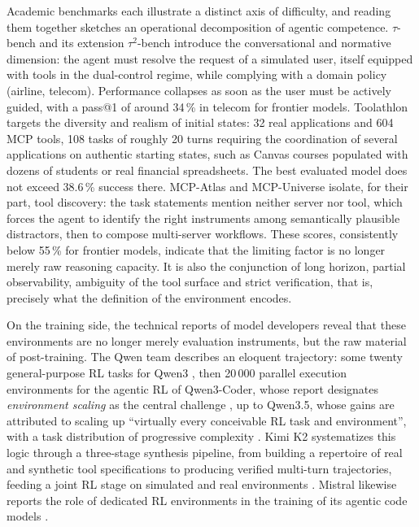 \documentclass[11pt,a4paper]{article}
\begin{document}
Academic benchmarks each illustrate a distinct axis of difficulty, and reading them together sketches an operational decomposition of agentic competence. $\tau$-bench and its extension $\tau^2$-bench \cite{taubench2024, tau2bench2025} introduce the conversational and normative dimension: the agent must resolve the request of a simulated user, itself equipped with tools in the dual-control regime, while complying with a domain policy (airline, telecom). Performance collapses as soon as the user must be actively guided, with a pass@1 of around 34\,\% in telecom for frontier models. Toolathlon \cite{toolathlon2025} targets the diversity and realism of initial states: 32 real applications and 604 MCP tools, 108 tasks of roughly 20 turns requiring the coordination of several applications on authentic starting states, such as Canvas courses populated with dozens of students or real financial spreadsheets. The best evaluated model does not exceed 38.6\,\% success there. MCP-Atlas \cite{mcpatlas2026} and MCP-Universe \cite{mcpuniverse2025} isolate, for their part, tool discovery: the task statements mention neither server nor tool, which forces the agent to identify the right instruments among semantically plausible distractors, then to compose multi-server workflows. These scores, consistently below 55\,\% for frontier models, indicate that the limiting factor is no longer merely raw reasoning capacity. It is also the conjunction of long horizon, partial observability, ambiguity of the tool surface and strict verification, that is, precisely what the definition of the environment encodes.

On the training side, the technical reports of model developers reveal that these environments are no longer merely evaluation instruments, but the raw material of post-training. The Qwen team describes an eloquent trajectory: some twenty general-purpose RL tasks for Qwen3 \cite{qwen3_2025}, then 20\,000 parallel execution environments for the agentic RL of Qwen3-Coder, whose report designates \emph{environment scaling} as the central challenge \cite{qwen3coder2025}, up to Qwen3.5, whose gains are attributed to scaling up ``virtually every conceivable RL task and environment'', with a task distribution of progressive complexity \cite{qwen35_2026}. Kimi K2 systematizes this logic through a three-stage synthesis pipeline, from building a repertoire of real and synthetic tool specifications to producing verified multi-turn trajectories, feeding a joint RL stage on simulated and real environments \cite{kimik2_2025}. Mistral likewise reports the role of dedicated RL environments in the training of its agentic code models \cite{magistral2025}.
\end{document}
